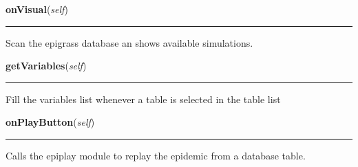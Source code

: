     \vspace{0.5ex}

    \begin{boxedminipage}{\textwidth}

    \raggedright \textbf{onVisual}(\textit{self})

    \vspace{-1.5ex}

    \rule{\textwidth}{0.5\fboxrule}
    Scan the epigrass database an shows available simulations.

    \vspace{1ex}

    \end{boxedminipage}

    \label{epigrass:MainPanel_Impl:getVariables}

    \vspace{0.5ex}

    \begin{boxedminipage}{\textwidth}

    \raggedright \textbf{getVariables}(\textit{self})

    \vspace{-1.5ex}

    \rule{\textwidth}{0.5\fboxrule}
    Fill the variables list whenever a table is selected in the table list

    \vspace{1ex}

    \end{boxedminipage}

    \label{epigrass:MainPanel_Impl:onPlayButton}

    \vspace{0.5ex}

    \begin{boxedminipage}{\textwidth}

    \raggedright \textbf{onPlayButton}(\textit{self})

    \vspace{-1.5ex}

    \rule{\textwidth}{0.5\fboxrule}
    Calls the epiplay module to replay the epidemic from a database table.

    \vspace{1ex}

    \end{boxedminipage}

